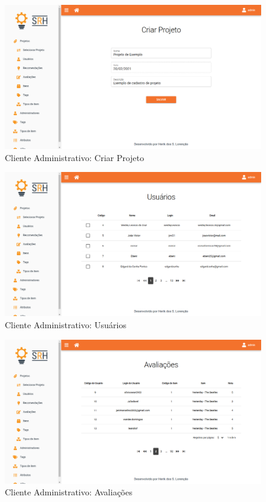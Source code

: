 \begin{figure}[H]
	\centering
	\includegraphics[width=.9\linewidth]{imagens/adminCriarProjetoForm.png}
	\caption[Cliente Administrativo: Criar Projeto]{Cliente Administrativo: Criar Projeto}
    \label{fig:clienteAdminCriarProjeto}
\end{figure}

\begin{figure}[H]
	\centering
	\includegraphics[width=.9\linewidth]{imagens/adminUsuarios.png}
	\caption[Cliente Administrativo - Usuários]{Cliente Administrativo: Usuários}
    \label{fig:clienteAdminUsuarios}
\end{figure}

\begin{figure}[H]
	\centering
	\includegraphics[width=.9\linewidth]{imagens/adminAvaliacoes.png}
	\caption[Cliente Administrativo: Avaliações]{Cliente Administrativo: Avaliações}
    \label{fig:clienteAdminAvaliacoes}
\end{figure}

